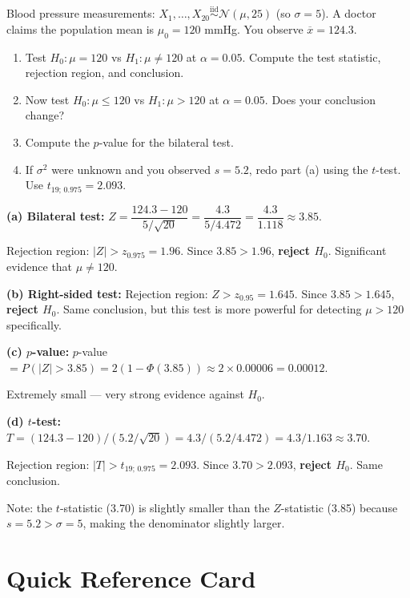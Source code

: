 \documentclass[11pt,a4paper]{article}
\newcommand{\iid}{\overset{\text{iid}}{\sim}}
\newenvironment{solution}{%
  \begin{tcolorbox}[answerbox, title={Solution}]
}{%
  \end{tcolorbox}
}
\newcounter{quizq}
\newenvironment{quizquestion}[1]{%
  \refstepcounter{quizq}%
  \begin{tcolorbox}[quizbox, title={Quiz Question \thequizq\ --- #1}]
}{%
  \end{tcolorbox}
}
\begin{document}
\begin{quizquestion}{Full exam-style problem}
Blood pressure measurements: $X_1,\ldots,X_{20}\iid\mathcal{N}(\mu,25)$ (so $\sigma=5$). A doctor claims the population mean is $\mu_0=120$ mmHg. You observe $\overline{x}=124.3$.

\begin{enumerate}[label=(\alph*)]
  \item Test $H_0:\mu=120$ vs $H_1:\mu\neq 120$ at $\alpha=0.05$. Compute the test statistic, rejection region, and conclusion.
  \item Now test $H_0:\mu\leq 120$ vs $H_1:\mu>120$ at $\alpha=0.05$. Does your conclusion change?
  \item Compute the $p$-value for the bilateral test.
  \item If $\sigma^2$ were unknown and you observed $s=5.2$, redo part (a) using the $t$-test. Use $t_{19;\,0.975}=2.093$.
\end{enumerate}
\end{quizquestion}

\begin{solution}
\textbf{(a) Bilateral test:}
$Z = \dfrac{124.3-120}{5/\sqrt{20}} = \dfrac{4.3}{5/4.472} = \dfrac{4.3}{1.118} \approx 3.85$.

Rejection region: $|Z|>z_{0.975}=1.96$. Since $3.85>1.96$, \textbf{reject $H_0$}. Significant evidence that $\mu\neq 120$.

\textbf{(b) Right-sided test:}
Rejection region: $Z>z_{0.95}=1.645$. Since $3.85>1.645$, \textbf{reject $H_0$}. Same conclusion, but this test is more powerful for detecting $\mu>120$ specifically.

\textbf{(c) $p$-value:}
$p$-value $= P(|Z|>3.85) = 2(1-\Phi(3.85)) \approx 2\times 0.00006 = 0.00012$.

Extremely small --- very strong evidence against $H_0$.

\textbf{(d) $t$-test:}
$T = (124.3-120)/(5.2/\sqrt{20}) = 4.3/(5.2/4.472) = 4.3/1.163 \approx 3.70$.

Rejection region: $|T|>t_{19;\,0.975}=2.093$. Since $3.70>2.093$, \textbf{reject $H_0$}. Same conclusion.

Note: the $t$-statistic (3.70) is slightly smaller than the $Z$-statistic (3.85) because $s=5.2>\sigma=5$, making the denominator slightly larger.
\end{solution}

\section{Quick Reference Card}
\end{document}
